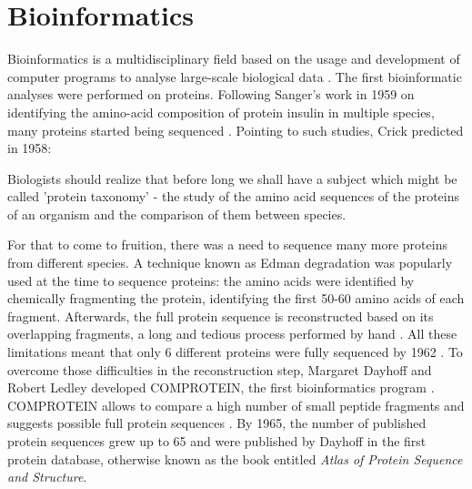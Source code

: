 \section{Bioinformatics}



Bioinformatics is a multidisciplinary field based on the usage and development of computer programs to analyse large-scale biological data \cite{gauthier:2018ws}. The first bioinformatic analyses were performed on proteins. Following Sanger's work in 1959 on identifying the amino-acid composition of protein insulin in multiple species, many proteins started being sequenced \cite{sanger:1955uw,ryle:1955wf,harris:1956ut,gauthier:2018ws}.
Pointing to such studies, Crick predicted in 1958:

\begin{displayquote}
Biologists should realize that before long we shall have a subject which might be called 'protein taxonomy' - the study of the amino acid sequences of the proteins of an organism and the comparison of them between species.
\end{displayquote}

For that to come to fruition, there was a need to sequence many more proteins from different species. A technique known as Edman degradation was popularly used at the time to sequence proteins: the amino acids were identified by chemically fragmenting the protein, identifying the first 50-60 amino acids of each fragment. Afterwards, the full protein sequence is reconstructed based on its overlapping fragments, a long and tedious process performed by hand \cite{gauthier:2018ws,edman:1949ww}. All these limitations meant that only 6 different proteins were fully sequenced by 1962 \cite{dayhoff:1962up}. To overcome those difficulties in the reconstruction step, Margaret Dayhoff and Robert Ledley developed COMPROTEIN, the first bioinformatics program \cite{gauthier:2018ws,dayhoff:1962up}. COMPROTEIN allows to compare a high number of small peptide fragments and suggests possible full protein sequences \cite{dayhoff:1962up}. By 1965, the number of published protein sequences grew up to 65 and were published by Dayhoff in the first protein database, otherwise known as the book entitled \emph{Atlas of Protein Sequence and Structure}\cite{dayhoff:1965vv}.

